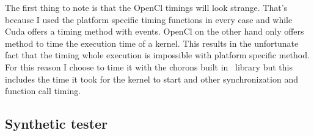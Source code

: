 \begin{table}[H]
\centering
{}
\caption{Timings of the first test for real pictures}
\label{tab:test1c}
\end{table}

\label{chap:reason}
The first thing to note is that the OpenCl timings will look strange. That's because I used the platform specific timing functions in every case and while Cuda offers a timing method with events. OpenCl on the other hand only offers method to time the execution time of a kernel. This results in the unfortunate fact that the timing whole execution is impossible with platform specific method. For this reason I choose to time it with the chorons built in \CC\ library but this includes the time it took for the kernel to start and other synchronization and function call timing.


\subsection{Synthetic tester}
\label{chap:test_synt_test}

